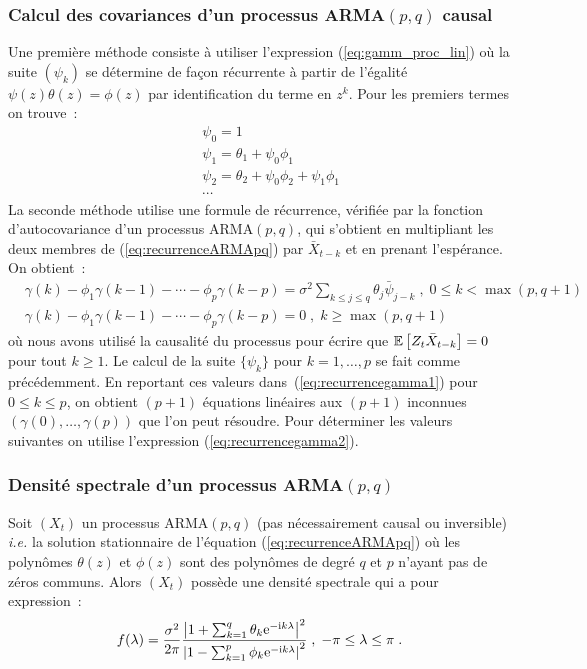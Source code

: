 \subsubsection{Calcul des covariances d'un processus ARMA$(p,q)$ causal}
Une premi\`ere m\'ethode consiste \`a utiliser l'expression
(\ref{eq:gamm_proc_lin}) %
   o\`u la suite $(\psi_k)$ se d\'etermine de fa\c{c}on r\'ecurrente \`a partir de
   l'\'egalit\'e $\psi(z)\theta(z)=\phi(z)$ par identification du terme en $z^k$.
   Pour les premiers termes on trouve~:
\begin{eqnarray*}
 &&\psi_0=1\\
 &&\psi_1=\theta_1+\psi_0\phi_1\\
 &&\psi_2=\theta_2+\psi_0\phi_2+\psi_1\phi_1\\
 &&\cdots
\end{eqnarray*}
La seconde m\'ethode utilise une formule de r\'ecurrence, v\'erifi\'ee par
la fonction d'autocovariance d'un processus ARMA$(p,q)$, qui
s'obtient en multipliant les deux membres de
(\ref{eq:recurrenceARMApq}) par $\bar{X}_{t-k}$ et en prenant
l'esp\'erance. On obtient~:
\begin{align}
 \label{eq:recurrencegamma1}
  &\gamma(k)-\phi_1\gamma(k-1)-\cdots-\phi_p\gamma(k-p)
  =
  \sigma^2\sum_{k\leq j\leq q}\theta_j\bar{\psi}_{j-k}\;,\;
0\leq k < \max(p,q+1)
  \\
 \label{eq:recurrencegamma2}
  &\gamma(k)-\phi_1\gamma(k-1)-\cdots-\phi_p\gamma(k-p)
  =
  0\;,\; k \geq \max(p,q+1)
\end{align}
o\`u nous avons utilis\'e la causalit\'e du processus pour \'ecrire
que ${\mathbb E}\left[ Z_t \bar{X}_{t-k} \right]=0$ pour tout $k\geq 1$. Le calcul de la
suite $\{\psi_k\}$ pour $k=1,\dots, p$ se fait comme pr\'ec\'edemment.
En reportant ces valeurs dans~(\ref{eq:recurrencegamma1}) pour
$0\leq k \leq p$, on obtient $(p+1)$ \'equations lin\'eaires aux
$(p+1)$ inconnues $(\gamma(0),\dots,\gamma(p))$ que l'on peut
r\'esoudre. Pour d\'eterminer les valeurs suivantes on utilise
l'expression (\ref{eq:recurrencegamma2}).
\subsubsection{Densit\'e spectrale d'un processus ARMA$(p,q)$}
\begin{theorem}
Soit $(X_t)$ un processus ARMA$(p,q)$ (pas n\'ecessairement causal ou
inversible) \textit{i.e.} la solution stationnaire de l'\'equation
(\ref{eq:recurrenceARMApq}) o\`u les polyn\^omes $\theta(z)$ et $\phi(z)$ sont des
polyn\^omes de degr\'e $q$ et $p$ n'ayant pas de z\'eros communs. Alors
$(X_t)$ poss\`ede une densit\'e spectrale qui a pour expression~:
\begin{equation}
 \label{eq:dspARMApq}
 f(\lambda)=\frac{\sigma^2}{2\pi}
    \frac{\left| 1+\sum_{k=1}^q \theta_k \mathrm{e}^{-\mathrm{i} k \lambda}\right|^2}
         {\left| 1-\sum_{k=1}^p \phi_k \mathrm{e}^{-\mathrm{i} k \lambda}\right|^2}\;,\; -\pi\leq\lambda\leq\pi\;.
\end{equation}
\end{theorem}

